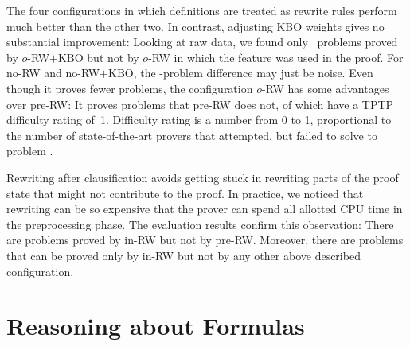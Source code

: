 \newcommand{\unknownres}{\ensuremath{{\varnothing}}}
\newcommand{\colalign}{\phantom{0}}

\begin{figure}[t]
  \centering
  \def\arraystretch{1.1}%
       \label{fig:rewrite}
     \end{figure}



The four configurations in which definitions are treated as rewrite rules
perform much better than the other two. In contrast, adjusting KBO weights gives
no substantial improvement: Looking at raw data, we found only
~problems proved by $o$-RW$+$KBO but not by $o$-RW in which the
feature was used in the proof. For no-RW and no-RW$+$KBO, the
-problem difference may just be noise. Even though it proves fewer
problems, the configuration $o$-RW has some advantages over pre-RW: It proves
 problems that pre-RW does not,  of which have a TPTP
difficulty rating of~1. Difficulty rating is a number from 0 to 1, proportional to the number
of state-of-the-art provers that attempted, but failed to solve to problem \cite{gscb-01-evaluating}.

Rewriting after clausification avoids getting stuck in rewriting parts of the
proof state that might not contribute to the proof. In practice, we noticed that
rewriting can be so expensive that the prover can spend all
allotted CPU time in the preprocessing phase. The evaluation results confirm this
observation: There are  problems proved by in-RW but not by
pre-RW. Moreover, there are  problems that can be proved only
by in-RW but not by any other above described configuration. %


\section{Reasoning about Formulas}
\label{sec:ho-tech:formulas}

